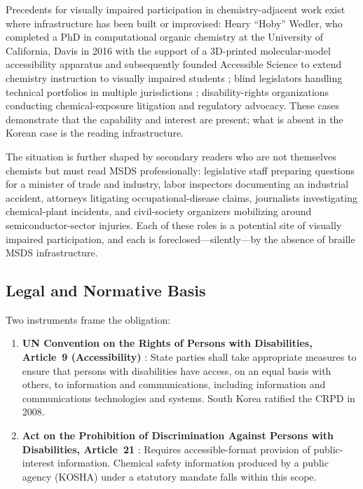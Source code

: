 \documentclass[smallextended]{svjour3}
\begin{document}
Precedents for visually impaired participation in chemistry-adjacent work exist where infrastructure has been built or improvised: Henry ``Hoby'' Wedler, who completed a PhD in computational organic chemistry at the University of California, Davis in 2016 with the support of a 3D-printed molecular-model accessibility apparatus and subsequently founded Accessible Science to extend chemistry instruction to visually impaired students \cite{wedler}; blind legislators handling technical portfolios in multiple jurisdictions \cite{nfb_legislators}; disability-rights organizations conducting chemical-exposure litigation and regulatory advocacy. These cases demonstrate that the capability and interest are present; what is absent in the Korean case is the reading infrastructure.

The situation is further shaped by secondary readers who are not themselves chemists but must read MSDS professionally: legislative staff preparing questions for a minister of trade and industry, labor inspectors documenting an industrial accident, attorneys litigating occupational-disease claims, journalists investigating chemical-plant incidents, and civil-society organizers mobilizing around semiconductor-sector injuries. Each of these roles is a potential site of visually impaired participation, and each is foreclosed---silently---by the absence of braille MSDS infrastructure.

\subsection{Legal and Normative Basis}

Two instruments frame the obligation:

\begin{enumerate}
\item \textbf{UN Convention on the Rights of Persons with Disabilities, Article~9 (Accessibility)} \cite{crpd}: State parties shall take appropriate measures to ensure that persons with disabilities have access, on an equal basis with others, to information and communications, including information and communications technologies and systems. South Korea ratified the CRPD in 2008.

\item \textbf{Act on the Prohibition of Discrimination Against Persons with Disabilities, Article~21} \cite{kdpa}: Requires accessible-format provision of public-interest information. Chemical safety information produced by a public agency (KOSHA) under a statutory mandate falls within this scope.
\end{enumerate}
\end{document}
